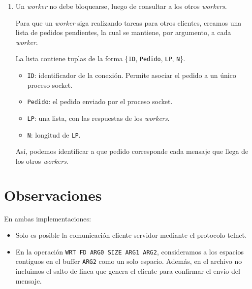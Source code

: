 \documentclass[a4paper, 8pt]{article}
\begin{document}
\begin{enumerate}
  \item Un \textit{worker} no debe bloquearse, luego de consultar a los otros \textit{workers}.
  
  Para que un \textit{worker} siga realizando tareas para otros clientes, creamos una lista de pedidos pendientes,
  la cual se mantiene, por argumento, a cada \textit{worker}.
  
  La lista contiene tuplas de la forma \{\texttt{ID}, \texttt{Pedido}, \texttt{LP}, \texttt{N}\}.
  
  \begin{itemize}
    \item \texttt{ID}: identificador de la conexión. Permite asociar el pedido a un único proceso socket.
    \item \texttt{Pedido}: el pedido enviado por el proceso socket.
    \item \texttt{LP}: una lista, con las respuestas de los \textit{workers}.
    \item \texttt{N}: longitud de \texttt{LP}.
  \end{itemize}
  
  Así, podemos identificar a que pedido corresponde cada mensaje que llega de los otros \textit{workers}.
\end{enumerate}

\section{Observaciones}

En ambas implementaciones:

\begin{itemize}

% 

  \item Solo es posible la comunicación cliente-servidor mediante el protocolo telnet.
  
  \item En la operación \texttt{WRT FD ARG0 SIZE ARG1 ARG2}, consideramos a los espacios contiguos en el buffer \texttt{ARG2}
  como un solo espacio. Además, en el archivo no incluimos el salto de linea que genera el cliente para confirmar el envio del mensaje.
  
\end{itemize}
\end{document}
